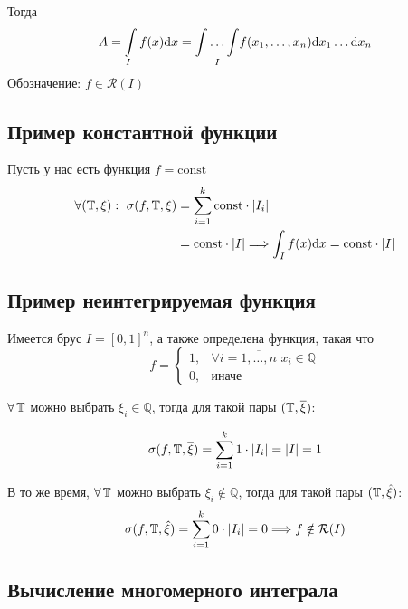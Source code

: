 Тогда 
$$A = \int\limits_If(x)\text{d}x = \underset{I}{\int\ldots\int}f(x_1, \ldots, x_n)\text{d}x_1\ldots \text{d}x_n$$
Обозначение: $f\in\mathcal{R}(I)$

\begin{center}
    
\end{center}


\subsection{Пример константной функции}

Пусть у нас есть функция $f = \text{const}$
\begin{equation*}
\begin{aligned}
    \forall(\T, \xi):\ \sigma(f, \T, \xi)&= \sum_{i = 1}^k \text{const}\cdot|I_i|\\
    &= \text{const}\cdot|I| \Longrightarrow \int_I f(x)\d{x} = \text{const}\cdot|I|
    \end{aligned}
\end{equation*}

\subsection{Пример неинтегрируемая функция}

Имеется брус $I = [0, 1]^n$, а также определена функция, такая что
\begin{equation*}
    f = \begin{cases}
        1,& \forall i = \overline{1,\ldots, n}\,\, x_i\in \mathbb{Q}\\
        0,&\text{иначе}
    \end{cases}
\end{equation*}

\proof $\forall \operatorname{\mathbb{T}}$ можно выбрать $\xi_i\in \mathbb{Q}$, тогда для такой пары $(\operatorname{\mathbb{T}}, \overline{\xi})$:

\begin{equation*}
    \sigma(f, \T, \overline{\xi}) = \sum_{i=1}^k1\cdot|I_i| = |I| = 1
\end{equation*}

В то же время, $\forall \operatorname{\mathbb{T}}$ можно выбрать $\xi_i\notin \mathbb{Q}$, тогда для такой пары $(\operatorname{\mathbb{T}}, \hat{\xi})$:
\begin{equation*}
    \sigma(f, \T, \hat{\xi}) = \sum_{i=1}^k0\cdot|I_i| = 0 \Longrightarrow f\notin\mathcal{R}(I)
\end{equation*}

\subsection{Вычисление многомерного интеграла}

